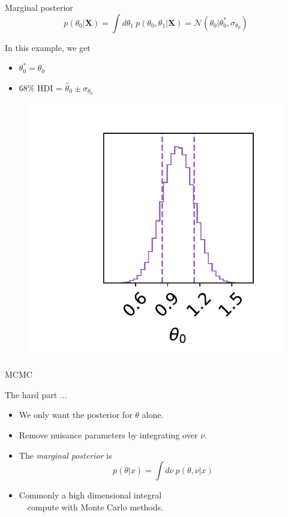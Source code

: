 \documentclass[
aspectratio=169,
14pt,
professionalfonts
]{beamer}
\newcommand{\arrow}{~\ding{220}~}
\begin{document}
\begin{frame}{Marginal posterior}
\vspace{-1cm}
    $$p(\theta_0|\boldsymbol{X}) = \int d\theta_1 ~ p(\theta_0, \theta_1|\boldsymbol{X}) = \mathcal{N}(\theta_0 | \theta_0^*, \sigma_{\theta_0})$$
    \begin{minipage}{0.4\linewidth}
    In this example, we get
        \begin{itemize}
            \item $\theta_0^* = \hat \theta_0$
            \item 68\% HDI = $\hat \theta_0 \pm \sigma_{\theta_0}$
        \end{itemize}
    \end{minipage}
    \begin{minipage}{0.59\linewidth}
    \begin{figure}
        \centering
        \includegraphics[width=0.7\linewidth]{../plots/marginal_posterior.pdf}
    \end{figure}
    \end{minipage}
\end{frame}

\begin{frame}
\center
\Large
MCMC
\end{frame}

\begin{frame}{The hard part ...}
\begin{itemize}
    \item We only want the posterior for $\theta$ alone.
    \item Remove nuisance parameters by integrating over $\nu$.
    \item[\arrow] The \textit{marginal posterior} is
        $$
        p(\theta | x) = \int d\nu ~ p(\theta, \nu | x)
        $$
    \item Commonly a high dimensional integral\\ \arrow compute with Monte Carlo methods.
\end{itemize}
\end{frame}
\end{document}
